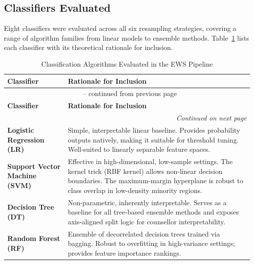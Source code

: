 \subsection{Classifiers Evaluated}
\label{subsec:classifiers}

Eight classifiers were evaluated across all six resampling strategies, covering a range of algorithm families from linear models to ensemble methods. Table~\ref{tab:classifiers_table} lists each classifier with its theoretical rationale for inclusion.

\begin{longtable}{|p{4.2cm}|p{11.4cm}|}
    \caption{Classification Algorithms Evaluated in the EWS Pipeline}
    \label{tab:classifiers_table} \\
    \hline
    \rowcolor{gray!20}
    \textbf{Classifier} &
    \textbf{Rationale for Inclusion} \\
    \hline
    \endfirsthead

    \multicolumn{2}{c}{\tablename~\thetable{} -- continued from previous page} \\
    \hline
    \rowcolor{gray!20}
    \textbf{Classifier} &
    \textbf{Rationale for Inclusion} \\
    \hline
    \endhead

    \hline \multicolumn{2}{r}{\textit{Continued on next page}} \\
    \endfoot

    \hline
    \endlastfoot

    \textbf{Logistic Regression (LR)} &
    Simple, interpretable linear baseline. Provides probability outputs natively, making it suitable for threshold tuning. Well-suited to linearly separable feature spaces. \\
    \hline

    \textbf{Support Vector Machine (SVM)} &
    Effective in high-dimensional, low-sample settings. The kernel trick (RBF kernel) allows non-linear decision boundaries. The maximum-margin hyperplane is robust to class overlap in low-density minority regions. \\
    \hline

    \textbf{Decision Tree (DT)} &
    Non-parametric, inherently interpretable. Serves as a baseline for all tree-based ensemble methods and exposes axis-aligned split logic for counsellor interpretability. \\
    \hline

    \textbf{Random Forest (RF)} &
    Ensemble of decorrelated decision trees trained via bagging. Robust to overfitting in high-variance settings; provides feature importance rankings. \\
    \hline


\end{longtable}
